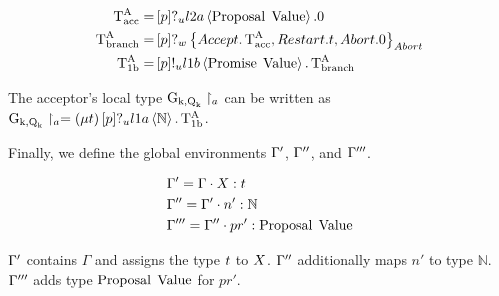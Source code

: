 \begin{align*}    
\operatorname{T^{A}_{acc}} =& \left[p\right]?_u l2a \left\langle \operatorname{Proposal}\; \operatorname{Value} \right\rangle.0
\\
\operatorname{T^{A}_{branch}} =& \left[p\right]?_w \left\{\mathnormal{Accept} . \operatorname{T^{A}_{acc}} , \mathnormal{Restart} . t , \mathnormal{Abort} .0\right\}_{\mathnormal{Abort}}
\\
\operatorname{T^{A}_{1b}} =& \left[p\right]!_u l1b \left\langle \operatorname{Promise}\; \operatorname{Value} \right\rangle . \operatorname{T^{A}_{branch}}
\end{align*}

The acceptor's local type $\operatorname{G_{k, \operatorname{Q}_{k}}} \upharpoonright_{a}$ can be written as $\operatorname{G_{k, \operatorname{Q}_{k}}} \upharpoonright_{a} = \left(\mu t\right)\left[p\right]?_u l1a \left\langle \mathbb{N} \right\rangle.\operatorname{T^{A}_{1b}}$.

Finally, we define the global environments $\Gamma'$, $\Gamma''$, and $\Gamma'''$.

\begin{align*}
&\Gamma' = \Gamma \cdot X:t\\
&\Gamma'' = \Gamma' \cdot n':\mathbb{N}\\
&\Gamma''' = \Gamma'' \cdot pr':\operatorname{Proposal}\; \operatorname{Value}
\end{align*}

$\Gamma'$ contains $\Gamma$ and assigns the type $t$ to $X$.
$\Gamma''$ additionally maps $n'$ to type $\mathbb{N}$.
$\Gamma'''$ adds type $\operatorname{Proposal}\; \operatorname{Value}$ for $pr'$.

